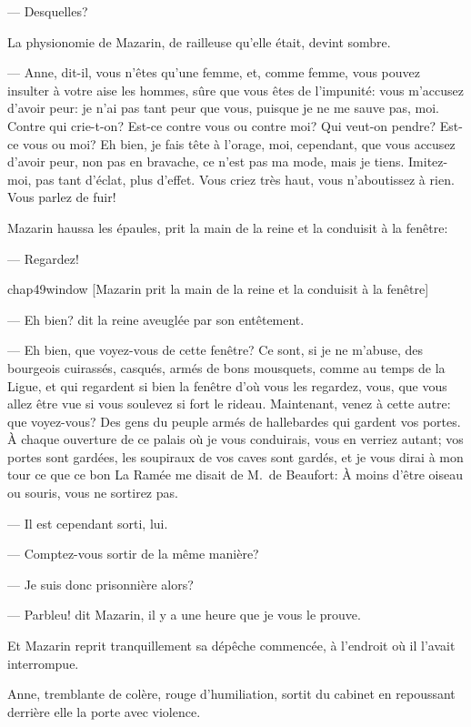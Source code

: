— Desquelles?

La physionomie de Mazarin, de railleuse qu'elle était, devint sombre.

— Anne, dit-il, vous n'êtes qu'une femme, et, comme femme, vous pouvez insulter à votre aise les hommes, sûre que vous êtes de l'impunité: vous m'accusez d'avoir peur: je n'ai pas tant peur que vous, puisque je ne me sauve pas, moi. Contre qui crie-t-on? Est-ce contre vous ou contre moi? Qui veut-on pendre? Est-ce vous ou moi? Eh bien, je fais tête à l'orage, moi, cependant, que vous accusez d'avoir peur, non pas en bravache, ce n'est pas ma mode, mais je tiens. Imitez-moi, pas tant d'éclat, plus d'effet. Vous criez très haut, vous n'aboutissez à rien. Vous parlez de fuir!

Mazarin haussa les épaules, prit la main de la reine et la conduisit à la fenêtre:

— Regardez!

\begin{bwbigpic}
	[\basicscale] 
	{chap49window}
	[Mazarin prit la main de la reine et la conduisit à la fenêtre]
\end{bwbigpic}

— Eh bien? dit la reine aveuglée par son entêtement.

— Eh bien, que voyez-vous de cette fenêtre? Ce sont, si je ne m'abuse, des bourgeois cuirassés, casqués, armés de bons mousquets, comme au temps de la Ligue, et qui regardent si bien la fenêtre d'où vous les regardez, vous, que vous allez être vue si vous soulevez si fort le rideau. Maintenant, venez à cette autre: que voyez-vous? Des gens du peuple armés de hallebardes qui gardent vos portes. À chaque ouverture de ce palais où je vous conduirais, vous en verriez autant; vos portes sont gardées, les soupiraux de vos caves sont gardés, et je vous dirai à mon tour ce que ce bon La Ramée me disait de M.~de Beaufort: À moins d'être oiseau ou souris, vous ne sortirez pas.

— Il est cependant sorti, lui.

— Comptez-vous sortir de la même manière?

— Je suis donc prisonnière alors?

— Parbleu! dit Mazarin, il y a une heure que je vous le prouve.

Et Mazarin reprit tranquillement sa dépêche commencée, à l'endroit où il l'avait interrompue.

Anne, tremblante de colère, rouge d'humiliation, sortit du cabinet en repoussant derrière elle la porte avec violence.

